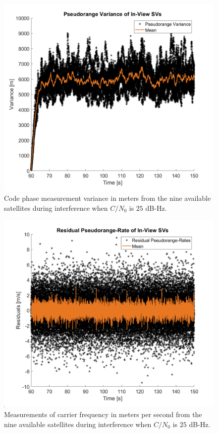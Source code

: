 \documentclass[12pt]{report}
\begin{document}
\begin{figure}[!ht]
  \centering
  \includegraphics[width=0.75\linewidth]{Figures/Results/Scenario1/Case25/codeVariance.png}
  \caption{Code phase measurement variance in meters from the nine available satellites during interference when \(C/N_0\) is \(25\) dB-Hz.}\label{fig:codephaseVariance25}
\end{figure}

\begin{figure}[!ht]
  \centering
  \includegraphics[width=0.75\linewidth]{Figures/Results/Scenario1/Case25/carrierFreq.png}
  \caption{Measurements of carrier frequency in meters per second from the nine available satellites during interference when \(C/N_0\) is \(25\) dB-Hz.}\label{fig:carrier25}
\end{figure}
\end{document}
